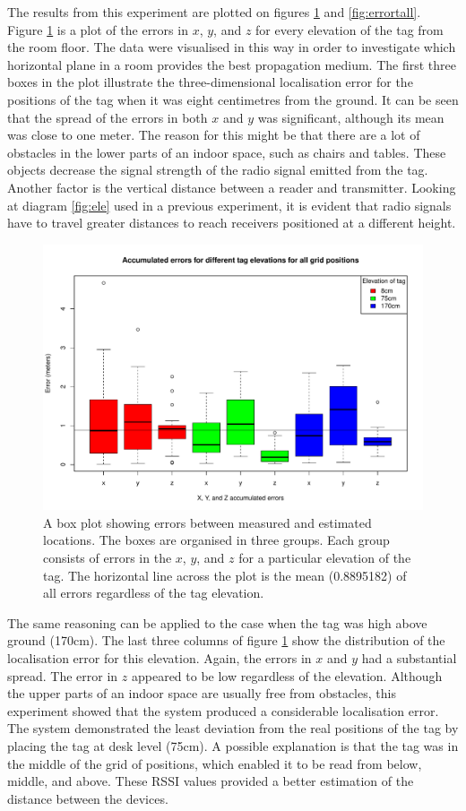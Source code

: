 The results from this experiment are plotted on figures \ref{fig:errorbox3d} and \ref{fig:errortall}. Figure \ref{fig:errorbox3d} is a plot of the errors in $x$, $y$, and $z$ for every elevation of the tag from the room floor. The data were visualised in this way in order to investigate which horizontal plane in a room provides the best propagation medium. The first three boxes in the plot illustrate the three-dimensional localisation error for the positions of the tag when it was eight centimetres from the ground. It can be seen that the spread of the errors in both $x$ and $y$ was significant, although its mean was close to one meter. The reason for this might be that there are a lot of obstacles in the lower parts of an indoor space, such as chairs and tables. These objects decrease the signal strength of the radio signal emitted from the tag. Another factor is the vertical distance between a reader and transmitter. Looking at diagram \ref{fig:ele} used in a previous experiment, it is evident that radio signals have to travel greater distances to reach receivers positioned at a different height.
\begin{figure}[H]
	\begin{center}
		\includegraphics[width=.8\textwidth]{figures/error_boxplot_3d}
		\caption{A box plot showing errors between measured and estimated locations. The boxes are organised in three groups. Each group consists of errors in the $x$, $y$, and $z$ for a particular elevation of the tag. The horizontal line across the plot is the mean (0.8895182) of all errors regardless of the tag elevation.}
		\label{fig:errorbox3d}
	\end{center}
\end{figure}
The same reasoning can be applied to the case when the tag was high above ground (170cm). The last three columns of figure \ref{fig:errorbox3d} show the distribution of the localisation error for this elevation. Again, the errors in $x$ and $y$ had a substantial spread. The error in $z$ appeared to be low regardless of the elevation. Although the upper parts of an indoor space are usually free from obstacles, this experiment showed that the system produced a considerable localisation error. The system demonstrated the least deviation from the real positions of the tag by placing the tag at desk level (75cm). A possible explanation is that the tag was in the middle of the grid of positions, which enabled it to be read from below, middle, and above. These RSSI values provided a better estimation of the distance between the devices.
